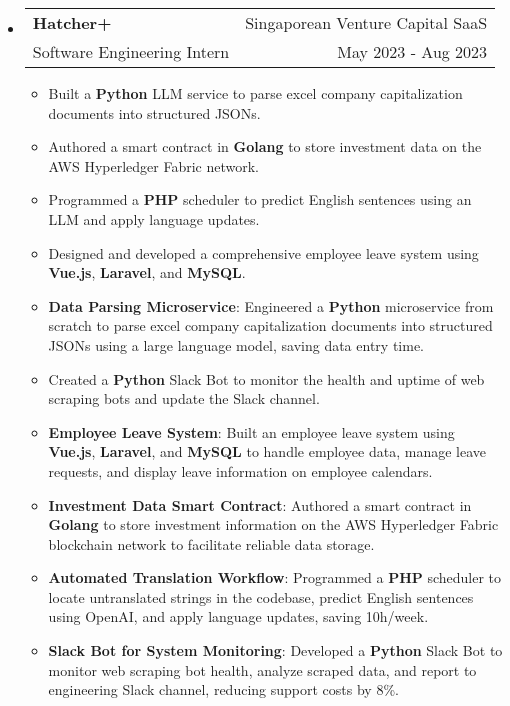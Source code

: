 \documentclass[letterpaper, 11pt]{article}
\makeatletter
\newcommand{\ResumeEntryTSDL}[4]{
  \vspace{1pt}\item
    \begin{tabular*}{\textwidth}[t]{l@{\extracolsep{\fill}}r} 
      \textbf{#1} & #2 \\
      #3 & #4 \\
    \end{tabular*}\vspace{-2.835pt} %
}
\newcommand{\ResumeItem}[2]{
  \item{
    \textbf{#1}{: #2 \vspace{-2.835pt}}
  }
}
\newcommand{\ResumeItemDefault}[1]{
  \item{
    #1 \vspace{-2.835pt}
  }
}
\newcommand{\ResumeEntryStart}{\begin{itemize}[leftmargin=0mm, label={}]}
\newcommand{\ResumeEntryEnd}{\end{itemize}\vspace{-2.835pt}} %
\newcommand{\ResumeItemListStart}{\begin{itemize}[leftmargin=5mm, label=$\bullet$, itemsep=1mm, parsep=1mm]} %
\newcommand{\ResumeItemListEnd}{\end{itemize}}
\makeatother
\begin{document}
  \ResumeEntryStart
    \ResumeEntryTSDL{Hatcher+}{Singaporean Venture Capital SaaS}{Software Engineering Intern}{May 2023 - Aug 2023}
    \ResumeItemListStart
      \ResumeItemDefault{Built a \textbf{Python} LLM service to parse excel company capitalization documents into structured JSONs.}
      \ResumeItemDefault{Authored a smart contract in \textbf{Golang} to store investment data on the AWS Hyperledger Fabric network.}
      \ResumeItemDefault{Programmed a \textbf{PHP} scheduler to predict English sentences using an LLM and apply language updates.}
      \ResumeItemDefault{Designed and developed a comprehensive employee leave system using \textbf{Vue.js}, \textbf{Laravel}, and \textbf{MySQL}.}
      \ResumeItem{Data Parsing Microservice}
        {Engineered a \textbf{Python} microservice from scratch to parse excel company capitalization documents into structured JSONs using a large language model, saving data entry time.}
      \ResumeItemDefault{Created a \textbf{Python} Slack Bot to monitor the health and uptime of web scraping bots and update the Slack channel.}
      \ResumeItem{Employee Leave System}
        {Built an employee leave system using \textbf{Vue.js}, \textbf{Laravel}, and \textbf{MySQL} to handle employee data, manage leave requests, and display leave information on employee calendars.}
      \ResumeItem{Investment Data Smart Contract}
        {Authored a smart contract in \textbf{Golang} to store investment information on the AWS Hyperledger Fabric blockchain network to facilitate reliable data storage.}
      \ResumeItem{Automated Translation Workflow}
      {Programmed a \textbf{PHP} scheduler to locate untranslated strings in the codebase, predict English sentences using OpenAI, and apply language updates, saving 10h/week.}
      \ResumeItem{Slack Bot for System Monitoring}
      {Developed a \textbf{Python} Slack Bot to monitor web scraping bot health, analyze scraped data, and report to engineering Slack channel, reducing support costs by 8\%.}
    \ResumeItemListEnd
  \ResumeEntryEnd
\end{document}
